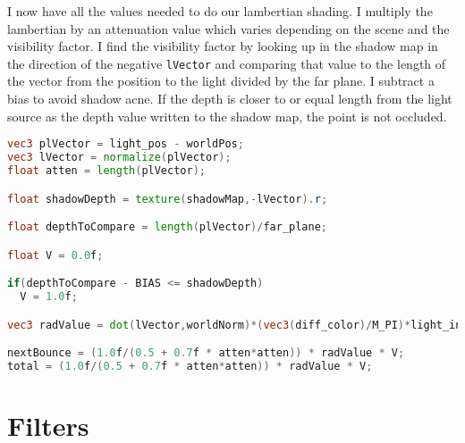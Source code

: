 I now have all the values needed to do our lambertian shading. I multiply the lambertian by an attenuation value which varies depending on the scene and the visibility factor. I find the visibility factor by looking up in the shadow map in the direction of the negative \verb=lVector= and comparing that value to the length of the vector from the position to the light divided by the far plane. I subtract a bias to avoid shadow acne. If the depth is closer to or equal length from the light source as the depth value written to the shadow map, the point is not occluded.
\begin{lstlisting}[caption={lambert.frag},language=GLSL]
vec3 plVector = light_pos - worldPos;
vec3 lVector = normalize(plVector);
float atten = length(plVector);

float shadowDepth = texture(shadowMap,-lVector).r;

float depthToCompare = length(plVector)/far_plane;

float V = 0.0f;

if(depthToCompare - BIAS <= shadowDepth)
  V = 1.0f;

vec3 radValue = dot(lVector,worldNorm)*(vec3(diff_color)/M_PI)*light_intensity;

nextBounce = (1.0f/(0.5 + 0.7f * atten*atten)) * radValue * V;
total = (1.0f/(0.5 + 0.7f * atten*atten)) * radValue * V;
\end{lstlisting}

\section{Filters}
